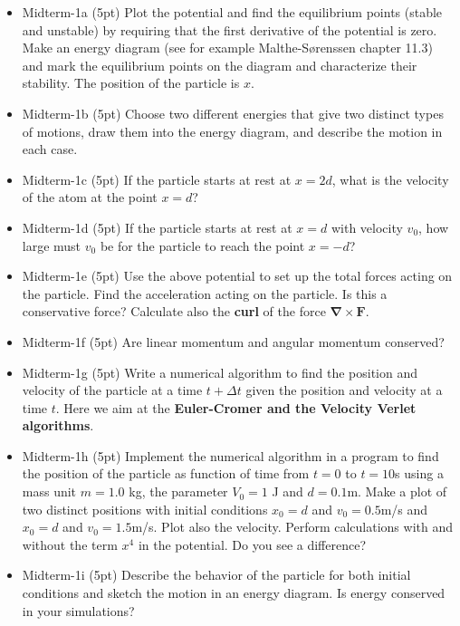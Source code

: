 \documentclass[%
oneside,                 %
final,                   %
10pt]{article}
\begin{document}
\begin{itemize}
\item Midterm-1a (5pt) Plot the potential and find the  equilibrium points (stable and unstable) by requiring that the first derivative of the potential is zero. Make an energy diagram (see for example Malthe-Sørenssen chapter 11.3) and mark the equilibrium points on the diagram and characterize their stability. The position of the particle is $x$. 

\item Midterm-1b  (5pt) Choose two different energies that give two distinct types of motions, draw them into the energy diagram, and describe the motion in each case.

\item Midterm-1c (5pt) If the particle  starts at rest at $x=2d$, what is the velocity of the atom at the point $x=d$?

\item Midterm-1d (5pt) If the particle  starts at rest at $x=d$ with velocity $v_0$, how large must $v_0$ be for the  particle to reach the point $x=−d$?

\item Midterm-1e (5pt) Use the above potential to set up the total forces acting on the particle.  Find the acceleration acting on the particle. Is this a conservative force? Calculate also the \textbf{curl} of the force  $\bm{\nabla}\times \bm{F}$. 

\item Midterm-1f (5pt) Are linear momentum and angular momentum conserved? 

\item Midterm-1g (5pt) Write a numerical algorithm to find the position and velocity of the particle at a time $t+\Delta t$ given the position and velocity at a time $t$. Here we aim at the \textbf{Euler-Cromer and the Velocity Verlet algorithms}.  

\item Midterm-1h (5pt) Implement the numerical algorithm in a program to find the position of the particle as function of time from $t=0$ to $t=10$s using a mass unit $m=1.0$ kg, the parameter $V_0=1$ J and $d=0.1$m. Make a plot of two distinct positions with initial conditions $x_0=d$ and $v_0=0.5$m/s and $x_0=d$ and $v_0=1.5$m/s. Plot also the velocity.  Perform calculations with and without the term $x^4$ in the potential. Do you see a difference? 

\item Midterm-1i (5pt) Describe the behavior of the particle for both initial conditions  and sketch the motion in an energy diagram. Is energy conserved in your simulations?
\end{itemize}
\end{document}
